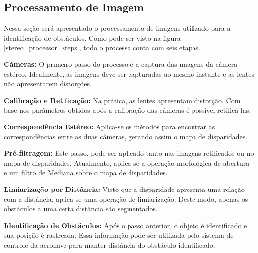 \subsection{Processamento de Imagem}

Nessa seção será apresentado o processamento de imagens utilizado para a identificação de obstáculos. Como pode ser visto na figura \ref{stereo_processor_steps}, todo o processo conta com seis etapas.

\textbf{Câmeras:} O primeiro passo do processo é a captura das imagens da câmera estéreo. Idealmente, as imagens deve ser capturadas ao mesmo instante e as lentes não apresentarem distorções.   

\textbf{Calibração e Retificação:} Na prática, as lentes apresentam distorção. Com base nos parâmetros obtidos após a calibração das câmeras é possível retificá-las. 

\textbf{Correspondência Estéreo:} Aplica-se os métodos para encontrar as correspondências entre as duas câmeras, gerando assim o mapa de disparidades.

\textbf{Pré-filtragem:} Este passo, pode ser aplicado tanto nas imagens retificados ou no mapa de disparidades. Atualmente, aplica-se a operação morfológica de abertura e um filtro de Mediana sobre o mapa de disparidades. 

\textbf{Limiarização por Distância:} Visto que a disparidade apresenta uma relação com a distância, aplica-se uma operação de limiarização. Deste modo, apenas os obstáculos a uma certa distância são segmentados.

\textbf{Identificação de Obstáculos:} Após o passo anterior, o objeto é identificado e sua posição é rastreada. Essa informação pode ser utilizada pelo sistema de controle da aeronave para manter distância do obstáculo identificado.

